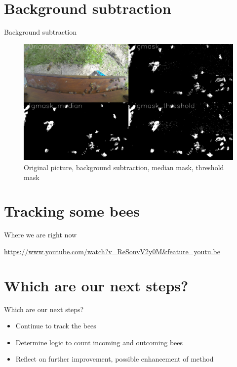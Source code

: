 \documentclass{beamer}
\begin{document}
\section{Background subtraction}
\begin{frame}{Background subtraction}
\begin{figure}
\includegraphics[scale=0.23]{pictures/backg2}
\caption{Original picture, background subtraction, median mask, threshold mask}
\end{figure}
\end{frame}

\section{Tracking some bees}
\begin{frame}{Where we are right now}

\centering 
\url{https://www.youtube.com/watch?v=ReSonvV2y0M&feature=youtu.be}
\end{frame}

\section{Which are our next steps?}
\begin{frame}{Which are our next steps?}
\begin{itemize}
\item Continue to track the bees
\item Determine logic to count incoming and outcoming bees
\item Reflect on further improvement, possible enhancement of method
\end{itemize}
\end{frame}
\end{document}

